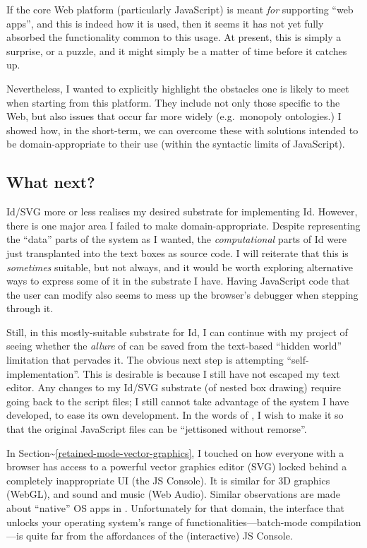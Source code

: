 If the core Web platform (particularly JavaScript) is meant \emph{for}
supporting ``web apps'', and this is indeed how it is used, then it
seems it has not yet fully absorbed the functionality common to this
usage. At present, this is simply a surprise, or a puzzle, and it might
simply be a matter of time before it catches up.

Nevertheless, I wanted to explicitly highlight the obstacles one is
likely to meet when starting from this platform. They include not only
those specific to the Web, but also issues that occur far more widely
(e.g.~monopoly ontologies.) I showed how, in the short-term, we can
overcome these with solutions intended to be domain-appropriate to their
use (within the syntactic limits of JavaScript).

\hypertarget{what-next}{%
\subsection{What next?}\label{what-next}}

Id{}/SVG more or less realises my desired substrate for implementing
Id{}. However, there is one major area I failed to make
domain-appropriate. Despite representing the ``data'' parts of the
system as I wanted, the \emph{computational} parts of Id{} were just
transplanted into the text boxes as source code. I will reiterate that
this is \emph{sometimes} suitable, but not always, and it would be worth
exploring alternative ways to express some of it in the substrate I
have. Having JavaScript code that the user can modify also seems to mess
up the browser's debugger when stepping through it.

Still, in this mostly-suitable substrate for Id{}, I can continue with
my project of seeing whether the \emph{allure} of \cite{COLAs} can be
saved from the text-based ``hidden world'' limitation that pervades it.
The obvious next step is attempting ``self-implementation''. This is
desirable is because I still have not escaped my text editor. Any
changes to my Id{}/SVG substrate (of nested box drawing) require going
back to the script files; I still cannot take advantage of the system I
have developed, to ease its own development. In the words of
\cite{COLAs}, I wish to make it so that the original JavaScript files
can be ``jettisoned without remorse''.

In Section\textasciitilde{}\ref{retained-mode-vector-graphics}, I
touched on how everyone with a browser has access to a powerful vector
graphics editor (SVG) locked behind a completely inappropriate UI (the
JS Console). It is similar for 3D graphics (WebGL), and sound and music
(Web Audio). Similar observations are made about ``native'' OS apps in
\cite{prog21-dyn}. Unfortunately for that domain, the interface that
unlocks your operating system's range of functionalities---batch-mode
compilation---is quite far from the affordances of the (interactive) JS
Console.

